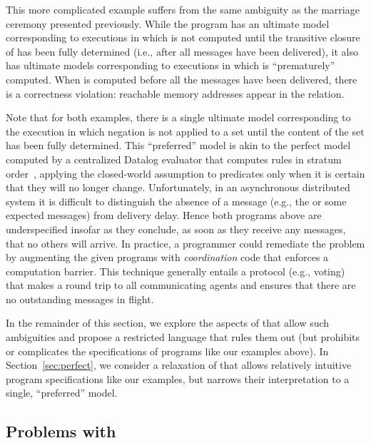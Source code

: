 This more complicated example suffers from the same ambiguity as the marriage
ceremony presented previously.  While the program has an ultimate model
corresponding to executions in which  is not computed until the
transitive closure of  has been fully determined (i.e.,
after all messages have been delivered), it also has ultimate models
corresponding to executions in which  is ``prematurely''
computed.  When  is computed before all the 
messages have been delivered, there is a correctness violation: reachable memory
addresses appear in the  relation.

Note that for both examples, there is a single ultimate model corresponding to
the execution in which negation is not applied to a set until the content of the
set has been fully determined.  This ``preferred'' model is akin to the perfect
model computed by a centralized Datalog evaluator that computes rules in stratum
order~\cite{ullmanbook}, applying the closed-world assumption to predicates only
when it is certain that they will no longer change.  Unfortunately, in an asynchronous
distributed system it is difficult to distinguish the absence of a message (e.g., the
 or some expected  messages) from delivery delay.
Hence both programs above are underspecified insofar as they conclude, as soon as they receive
any messages, that no others will arrive.
In practice, a programmer
could remediate the problem by augmenting the given programs with \emph{coordination}
code that enforces a computation barrier.  This technique generally entails a protocol
(e.g., voting) that makes a round trip to all communicating agents and ensures that 
there are no outstanding messages in flight.


In the remainder of this section, we explore the aspects of \lang that allow
such ambiguities and propose a restricted language \slang that rules them out
(but prohibits or complicates the specifications of programs like our examples above).  In
Section~\ref{sec:perfect}, we consider a relaxation of \slang that allows relatively intuitive program specifications like our examples, but narrows their interpretation to a
single, ``preferred'' model.

\subsection{Problems with \large \bf \lang}

